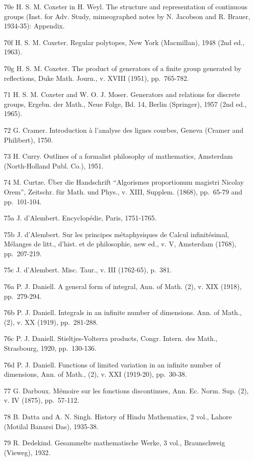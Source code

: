 70e H. S. M. Coxeter in H. Weyl. The structure and representation of continuous groups (Inst. for Adv. Study, mimeographed notes by N. Jacobson and R. Brauer, 1934-35): Appendix.

70f H. S. M. Coxeter. Regular polytopes, New York (Macmillan), 1948 (2nd ed., 1963).

70g H. S. M. Coxeter. The product of generators of a finite group generated by reflections, Duke Math. Journ., v. XVIII (1951), pp.~765-782.

71 H. S. M. Coxeter and W. O. J. Moser. Generators and relations for discrete groups, Ergebn. der Math., Neue Folge, Bd. 14, Berlin (Springer), 1957 (2nd ed., 1965).

72 G. Cramer. Introduction à l'analyse des lignes courbes, Geneva (Cramer and Philibert), 1750.

73 H. Curry. Outlines of a formalist philosophy of mathematics, Amsterdam (North-Holland Publ. Co.), 1951.

74 M. Curtze. Über die Handschrift ``Algorismes proportionum magistri Nicolay Orem'', Zeitschr. für Math. und Phys., v. XIII, Supplem. (1868), pp.~65-79 and pp.~101-104.

75a J. d'Alembert. Encyclopédie, Paris, 1751-1765.

75b J. d'Alembert. Sur les principes métaphysiques de Calcul infinitésimal, Mélanges de litt., d'hist. et de philosophie, new ed., v. V, Amsterdam (1768), pp.~207-219.

75c J. d'Alembert. Misc. Taur., v. III (1762-65), p.~381.

76a P. J. Daniell. A general form of integral, Ann. of Math. (2), v. XIX (1918), pp.~279-294.

76b P. J. Daniell. Integrals in an infinite number of dimensions. Ann. of Math., (2), v. XX (1919), pp.~281-288.

76c P. J. Daniell. Stieltjes-Volterra products, Congr. Intern. des Math., Strasbourg, 1920, pp.~130-136.

76d P. J. Daniell. Functions of limited variation in an infinite number of dimensions, Ann. of Math., (2), v. XXI (1919-20), pp.~30-38.

77 G. Darboux. Mémoire sur les fonctions discontinues, Ann. Ec. Norm. Sup. (2), v. IV (1875), pp.~57-112.

78 B. Datta and A. N. Singh. History of Hindu Mathematics, 2 vol., Lahore (Motilal Banarsi Das), 1935-38.

79 R. Dedekind. Gesammelte mathematische Werke, 3 vol., Braunschweig (Vieweg), 1932.

